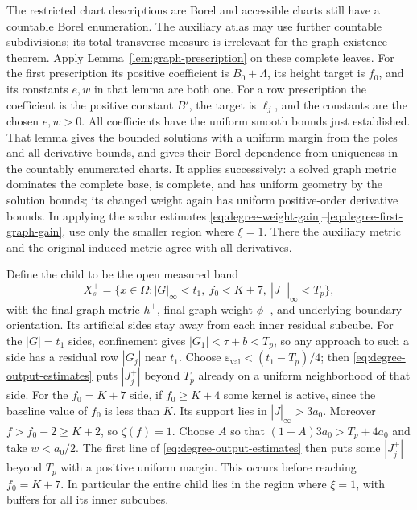 The restricted chart descriptions are Borel and accessible charts still
have a countable Borel enumeration.  The auxiliary atlas may use further
countable subdivisions; its total transverse measure is irrelevant for
the graph existence theorem.  Apply Lemma~\ref{lem:graph-prescription}
on these complete leaves.  For the first prescription its positive
coefficient is $B_0+\Lambda$, its height target is $f_0$, and its
constants $e,w$ in that lemma are both one.  For a row prescription the
coefficient is the positive constant $B'$, the target is $\ell_j$, and
the constants are the chosen $e,w>0$.  All coefficients have the
uniform smooth bounds just established.  That lemma gives the bounded
solutions with a uniform margin from the poles and all derivative
bounds, and gives their Borel dependence from uniqueness in the
countably enumerated charts.  It applies successively: a solved graph
metric dominates the complete base, is complete, and has uniform
geometry by the solution bounds; its changed weight again has uniform
positive-order derivative bounds.  In applying the scalar estimates
\eqref{eq:degree-weight-gain}--\eqref{eq:degree-first-graph-gain}, use
only the smaller region where $\xi=1$.  There the auxiliary metric and
the original induced metric agree with all derivatives.

Define the child to be the open measured band
\begin{equation}\label{eq:degree-child-domain}
 X_s^+=\{x\in\Omega: |G|_\infty<t_1,\ f_0<K+7,
                                      \ |J^+|_\infty<T_p\},
\end{equation}
with the final graph metric $h^+$, final graph weight $\phi^+$, and
underlying boundary orientation.  Its artificial sides stay away from
each inner residual subcube.  For the $|G|=t_1$ sides, confinement gives
$|G_1|<\tau+b<T_p$, so any approach to such a side has a residual row
$|G_j|$ near $t_1$.  Choose
$\varepsilon_{\mathrm{val}}<(t_1-T_p)/4$; then
\eqref{eq:degree-output-estimates} puts $|J_j^+|$ beyond $T_p$ already
on a uniform neighborhood of that side.  For the $f_0=K+7$ side, if
$f_0\ge K+4$ some kernel is active, since the baseline value of $f_0$
is less than $K$.  Its support lies in $|\bar J|_\infty>3a_0$.
Moreover $f>f_0-2\ge K+2$, so $\zeta(f)=1$.  Choose $A$ so that
$(1+A)3a_0>T_p+4a_0$ and take $w<a_0/2$.  The first line of
\eqref{eq:degree-output-estimates} then puts some $|J_j^+|$ beyond
$T_p$ with a positive uniform margin.  This occurs before reaching
$f_0=K+7$.  In particular the entire child lies in the region where
$\xi=1$, with buffers for all its inner subcubes.

